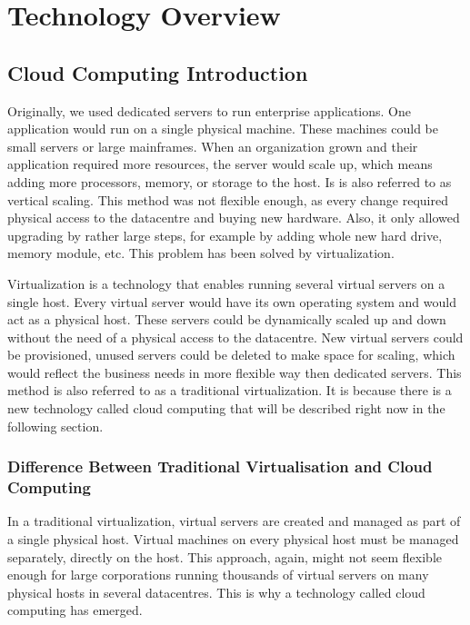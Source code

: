 
\chapter{Technology Overview}
\label{ch:overview}

\section{Cloud Computing Introduction}
Originally, we used dedicated servers to run enterprise applications. One application would run on a single physical machine. These machines could be small servers or large mainframes. When an organization grown and their application required more resources, the server would scale up, which means adding more processors, memory, or storage to the host. Is is also referred to as vertical scaling. This method was not flexible enough, as every change required physical access to the datacentre and buying new hardware. Also, it only allowed upgrading by rather large steps, for example by adding whole new hard drive, memory module, etc. This problem has been solved by virtualization.

Virtualization is a technology that enables running several virtual servers on a single host. Every virtual server would have its own operating system and would act as a physical host. These servers could be dynamically scaled up and down without the need of a physical access to the datacentre. New virtual servers could be provisioned, unused servers could be deleted to make space for scaling, which would reflect the business needs in more flexible way then dedicated servers. This method is also referred to as a traditional virtualization. It is because there is a new technology called cloud computing that will be described right now in the following section.

\subsection{Difference Between Traditional Virtualisation and Cloud Computing}
In a traditional virtualization, virtual servers are created and managed as part of a single physical host. Virtual machines on every physical host must be managed separately, directly on the host. This approach, again, might not seem flexible enough for large corporations running thousands of virtual servers on many physical hosts in several datacentres. This is why a technology called cloud computing has emerged.

